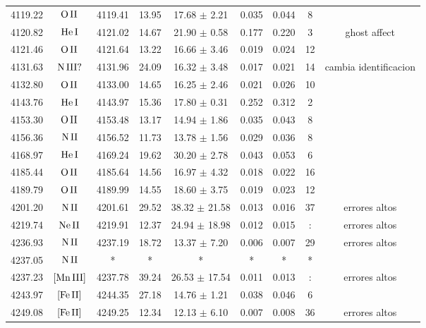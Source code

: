 \documentclass{article}
\begin{document}
\begin{table*}
\begin{adjustbox}{width=\textwidth}
\begin{tabular}{ccccccccc}
4119.22 & $\mbox{O}\thinspace \mbox{II}$ & 4119.41 & 13.95 & 17.68 $\pm$ 2.21 & 0.035 & 0.044 & 8 &  \\
4120.82 & $\mbox{He}\thinspace \mbox{I}$ & 4121.02 & 14.67 & 21.90 $\pm$ 0.58 & 0.177 & 0.220 & 3 &  ghost affect \\
4121.46 & $\mbox{O}\thinspace \mbox{II}$ & 4121.64 & 13.22 & 16.66 $\pm$ 3.46 & 0.019 & 0.024 & 12 &  \\
4131.63 & $\mbox{N}\thinspace \mbox{III?}$ & 4131.96 & 24.09 & 16.32 $\pm$ 3.48 & 0.017 & 0.021 & 14 &  cambia identificacion \\
4132.80 & $\mbox{O}\thinspace \mbox{II}$ & 4133.00 & 14.65 & 16.25 $\pm$ 2.46 & 0.021 & 0.026 & 10 &  \\
4143.76 & $\mbox{He}\thinspace \mbox{I}$ & 4143.97 & 15.36 & 17.80 $\pm$ 0.31 & 0.252 & 0.312 & 2 &  \\
4153.30 & $\mbox{O}\thinspace \mbox{II}$ & 4153.48 & 13.17 & 14.94 $\pm$ 1.86 & 0.035 & 0.043 & 8 &  \\
4156.36 & $\mbox{N}\thinspace \mbox{II}$ & 4156.52 & 11.73 & 13.78 $\pm$ 1.56 & 0.029 & 0.036 & 8 &  \\
4168.97 & $\mbox{He}\thinspace \mbox{I}$ & 4169.24 & 19.62 & 30.20 $\pm$ 2.78 & 0.043 & 0.053 & 6 &  \\
4185.44 & $\mbox{O}\thinspace \mbox{II}$ & 4185.64 & 14.56 & 16.97 $\pm$ 4.32 & 0.018 & 0.022 & 16 &  \\
4189.79 & $\mbox{O}\thinspace \mbox{II}$ & 4189.99 & 14.55 & 18.60 $\pm$ 3.75 & 0.019 & 0.023 & 12 &  \\
4201.20 & $\mbox{N}\thinspace \mbox{II}$ & 4201.61 & 29.52 & 38.32 $\pm$ 21.58 & 0.013 & 0.016 & 37 &  errores altos \\
4219.74 & $\mbox{Ne}\thinspace \mbox{II}$ & 4219.91 & 12.37 & 24.94 $\pm$ 18.98 & 0.012 & 0.015 & : &  errores altos \\
4236.93 & $\mbox{N}\thinspace \mbox{II}$ & 4237.19 & 18.72 & 13.37 $\pm$ 7.20 & 0.006 & 0.007 & 29 &  errores altos \\
4237.05 & $\mbox{N}\thinspace \mbox{II}$ & * & * & * & * & * & * &  \\
4237.23 & $\mbox{[Mn}\thinspace \mbox{III]}$ & 4237.78 & 39.24 & 26.53 $\pm$ 17.54 & 0.011 & 0.013 & : &  errores altos \\
4243.97 & $\mbox{[Fe}\thinspace \mbox{II]}$ & 4244.35 & 27.18 & 14.76 $\pm$ 1.21 & 0.038 & 0.046 & 6 &  \\
4249.08 & $\mbox{[Fe}\thinspace \mbox{II]}$ & 4249.25 & 12.34 & 12.13 $\pm$ 6.10 & 0.007 & 0.008 & 36 &  errores altos \\

\end{tabular}
\end{adjustbox}
\end{table*}
\end{document}
